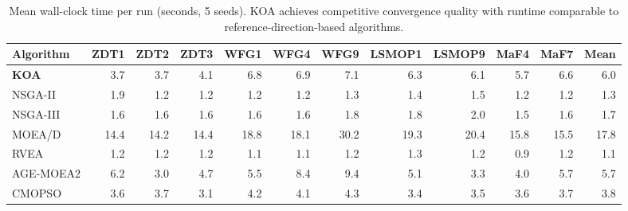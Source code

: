 \begin{table}[!t]
\renewcommand{\arraystretch}{1.05}
\caption{Mean wall-clock time per run (seconds, 5 seeds). KOA achieves competitive convergence quality with runtime comparable to reference-direction-based algorithms.}
\label{tab:runtime}
\centering
\tiny
\setlength{\tabcolsep}{2.5pt}
\begin{tabular}{lrrrrrrrrrrr}
\toprule
Algorithm & ZDT1 & ZDT2 & ZDT3 & WFG1 & WFG4 & WFG9 & LSMOP1 & LSMOP9 & MaF4 & MaF7 & Mean \\
\midrule
\textbf{KOA} & 3.7 & 3.7 & 4.1 & 6.8 & 6.9 & 7.1 & 6.3 & 6.1 & 5.7 & 6.6 & 6.0 \\
NSGA-II & 1.9 & 1.2 & 1.2 & 1.2 & 1.2 & 1.3 & 1.4 & 1.5 & 1.2 & 1.2 & 1.3 \\
NSGA-III & 1.6 & 1.6 & 1.6 & 1.6 & 1.6 & 1.8 & 1.8 & 2.0 & 1.5 & 1.6 & 1.7 \\
MOEA/D & 14.4 & 14.2 & 14.4 & 18.8 & 18.1 & 30.2 & 19.3 & 20.4 & 15.8 & 15.5 & 17.8 \\
RVEA & 1.2 & 1.2 & 1.2 & 1.1 & 1.1 & 1.2 & 1.3 & 1.2 & 0.9 & 1.2 & 1.1 \\
AGE-MOEA2 & 6.2 & 3.0 & 4.7 & 5.5 & 8.4 & 9.4 & 5.1 & 3.3 & 4.0 & 5.7 & 5.7 \\
CMOPSO & 3.6 & 3.7 & 3.1 & 4.2 & 4.1 & 4.3 & 3.4 & 3.5 & 3.6 & 3.7 & 3.8 \\
\bottomrule
\end{tabular}
\end{table}